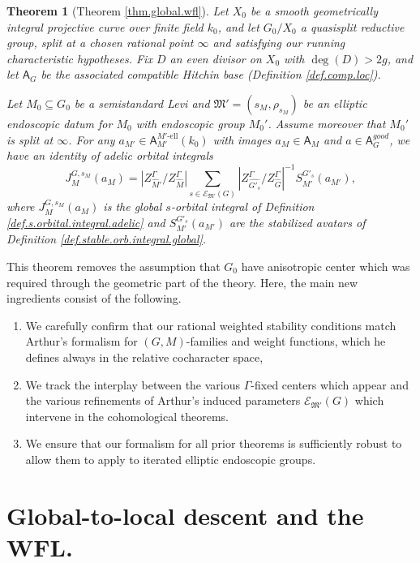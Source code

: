 \documentclass[openany]{amsbook}
\newtheorem{theorem}{Theorem}[chapter]
\theoremstyle{definition}
\theoremstyle{remark}
\numberwithin{equation}{section}
\newcommand{\cE}{\mathcal{E}}
\renewcommand{\-}{\operatorname{-}}
\newcommand{\good}{\mathit{good}}
\newcommand{\el}{\text{-ell}}
\newcommand{\bA}{\mathsf{A}}
\newcommand{\fM}{\mathfrak{M}}
\begin{document}
\begin{theorem}[{Theorem \ref{thm.global.wfl}}]
    Let $X_0$ be a smooth geometrically integral projective curve over finite field $k_0$, and let $G_0/X_0$ a quasisplit reductive group, split at a chosen rational point $\infty$ and satisfying our running characteristic hypotheses. Fix $D$ an even divisor on $X_0$ with $\deg(D) > 2g$, and let $\bA_G$ be the associated compatible Hitchin base (Definition \ref{def.comp.loc}).
    
    Let $M_0 \subseteq G_0$ be a semistandard Levi and $\fM' = (s_M, \rho_{s_M})$ be an elliptic endoscopic datum for $M_0$ with endoscopic group $M_0'$. Assume moreover that $M_0'$ is split at $\infty$. For any $a_{M'} \in \bA_{M'}^{M'\el}(k_0)$ with images $a_M \in \bA_M$ and $a \in \bA_G^{\good}$, we have an identity of adelic orbital integrals
    $$
        J^{G, s_M}_M(a_M) = |Z^\Gamma_{\widehat{M}'}/ Z_{\widehat{M}}^\Gamma| \sum_{s \in \cE_{\fM'}(G)} |Z_{\widehat{G'_s}}^\Gamma/ Z_{\widehat{G}}^\Gamma |^{-1} S_{M'}^{G'_s}(a_{M'}),
    $$
    where $J^{G, s_M}_M(a_M)$ is the global $s$-orbital integral of Definition \ref{def.s.orbital.integral.adelic} and $S_{M'}^{G'_s}(a_{M'})$ are the stabilized avatars of Definition \ref{def.stable.orb.integral.global}.
\end{theorem}
This theorem removes the assumption that $G_0$ have anisotropic center which was required through the geometric part of the theory. Here, the main new ingredients consist of the following. 
\begin{enumerate} 
\item We carefully confirm that our rational weighted stability conditions match Arthur's formalism for $(G,M)$-families and weight functions, which he defines always in the relative cocharacter space,
\item We track the interplay between the various $\Gamma$-fixed centers which appear and the various refinements of Arthur's induced parameters $\cE_{\fM'}(G)$ which intervene in the cohomological theorems.
\item We ensure that our formalism for all prior theorems is sufficiently robust to allow them to apply to iterated elliptic endoscopic groups.
\end{enumerate}



\section{Global-to-local descent and the WFL.}
\end{document}
